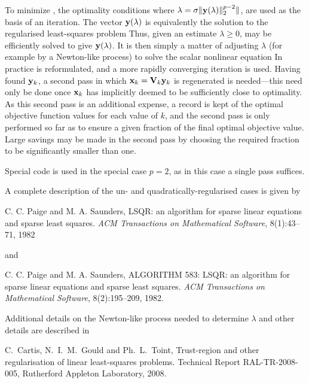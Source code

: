\documentclass{galahad}
\begin{document}
To minimize , the optimality conditions
where $\lambda = \sigma \|{\mathbf{y}}(\lambda)\|_2^{p-2} \|$,
are used as the basis of an iteration. 
The vector ${\mathbf{y}}(\lambda)$ is equivalently the solution to the 
regularised least-squares problem 
Thus, given an estimate $\lambda \geq 0$,  may be efficiently 
solved to give ${\mathbf{y}}(\lambda)$. 
It is then simply a matter of adjusting $\lambda$ 
(for example by a Newton-like process) to solve the scalar nonlinear equation
In practice  is reformulated, and a more rapidly converging iteration is
used. Having found  ${\mathbf{y}}_k$, a second pass in which 
${\mathbf{x}}_k = {\mathbf{V}}_k {\mathbf{y}}_k$ is regenerated is needed---this need only be done
once ${\mathbf{x}}_k$ has implicitly deemed to be sufficiently close to optimality.
As this second pass is an additional expense, a record is kept of the 
optimal objective function values for each value of $k$, and the second 
pass is only performed so far as to ensure a given fraction of the 
final optimal objective value. Large savings may be made in the second 
pass by choosing the required fraction to be significantly smaller than one. 
 
Special code is used in the special case $p=2$, as in this case a single
pass suffices.

\galreferences
A complete description of the un- and quadratically-regularised
cases is given by
\vspace*{1mm}

\noindent  
C. C. Paige and M. A. Saunders,
LSQR: an algorithm for sparse linear equations and sparse least  squares.
{\em ACM Transactions on Mathematical Software}, 8(1):43--71, 1982

\noindent  
and

\noindent  
C. C. Paige and M. A. Saunders,
ALGORITHM 583: LSQR: an algorithm for sparse linear equations and
  sparse least squares.
{\em ACM Transactions on Mathematical Software}, 8(2):195--209, 1982.

\noindent  
Additional details on the Newton-like process needed to determine $\lambda$ and
other details are described in 
\vspace*{1mm}

\noindent  
C.\ Cartis, N.\ I.\ M.\ Gould and Ph.\ L.\ Toint,
Trust-region and other regularisation of linear 
least-squares problems.
Technical Report RAL-TR-2008-005, Rutherford Appleton Laboratory, 2008.
\end{document}
